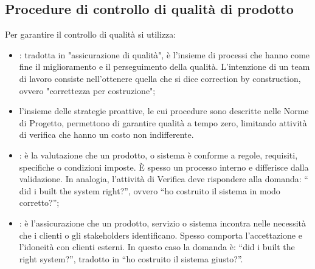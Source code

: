 \subsection{Procedure di controllo di qualità di prodotto} %
\label{2.3}
Per garantire il controllo di qualità si utilizza:
\begin{itemize}
\item {}: tradotta in "assicurazione di qualità", è l'insieme di processi che hanno come fine il miglioramento e il perseguimento della qualità. L'intenzione di un team di lavoro consiste nell'ottenere quella che si dice correction by construction, ovvero "correttezza per costruzione";
\item {}l'insieme delle strategie proattive, le cui procedure sono descritte nelle Norme di Progetto, permettono di garantire qualità a tempo zero, limitando attività di verifica che hanno un costo non indifferente.
\item {}: è la valutazione che un prodotto,  o sistema è conforme a regole, requisiti, specifiche o condizioni imposte. È spesso un processo interno e differisce dalla validazione. In analogia, l'attività di Verifica deve rispondere alla domanda: `` did i built the system right?'', ovvero ``ho costruito il sistema in modo corretto?'';
\item {}: è l'assicurazione che un prodotto, servizio o sistema incontra nelle necessità che i clienti o gli stakeholders identificano. Spesso comporta l'accettazione e l'idoneità con clienti esterni. In questo caso la domanda è: ``did i built the right system?'', tradotto in ``ho costruito il sistema giusto?''.
\end{itemize}

